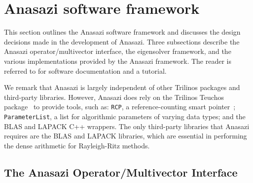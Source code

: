 \documentclass[acmtoms]{acmtrans2m}
\newcounter{algorithm}
\newcommand{\aspace}[1]{\texttt{#1}}
\begin{document}
\section{Anasazi software framework}
\label{sec:framework}

This section outlines the Anasazi software framework and discusses 
the design decisions made in the development of Anasazi. Three
subsections describe the Anasazi operator/multivector interface, the
eigensolver framework, and the various implementations provided by the
Anasazi framework. The reader is referred to
\cite{Trilinos:anasazi,Trilinos-Tutorial} for software documentation
and a tutorial.

We remark that Anasazi is largely independent of other Trilinos packages and
third-party libraries.  However, Anasazi does rely on the Trilinos Teuchos 
package~\cite{Trilinos:Teuchos} to provide tools, such as: \texttt{RCP},
a reference-counting smart pointer~\cite{Detlefs:1992:GCR,Teuchos-RCP};
\texttt{ParameterList}, a list for algorithmic parameters of
varying data types; and the BLAS \cite{Lawson:1979:BLA,Blackford:2002:USB} 
and LAPACK \cite{abbd:95} C++ wrappers.
The only third-party libraries that Anasazi requires are the BLAS and
LAPACK libraries, which are essential in performing the dense arithmetic
for Rayleigh-Ritz methods.


\subsection{The Anasazi Operator/Multivector Interface}
\label{sec:anasazi:opvec}
\end{document}
